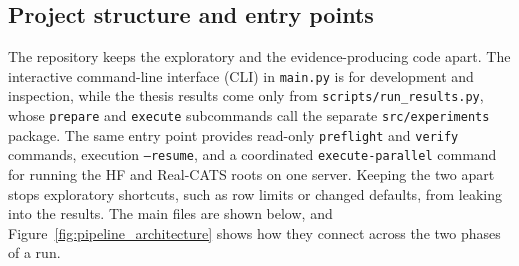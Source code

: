 \subsection{Project structure and entry points}

The repository keeps the exploratory and the evidence-producing code apart. The
interactive command-line interface (CLI) in \texttt{main.py} is for development
and inspection, while the thesis
results come only from \texttt{scripts/run\_results.py}, whose \texttt{prepare} and
\texttt{execute} subcommands call the separate \texttt{src/experiments} package.
The same entry point provides read-only \texttt{preflight} and \texttt{verify}
commands, execution \texttt{--resume}, and a coordinated
\texttt{execute-parallel} command for running the HF and Real-CATS roots on one
server.
Keeping the two apart stops exploratory shortcuts, such as row limits or changed
defaults, from leaking into the results. The main files are shown below, and
Figure~\ref{fig:pipeline_architecture} shows how they connect across the two
phases of a run.

